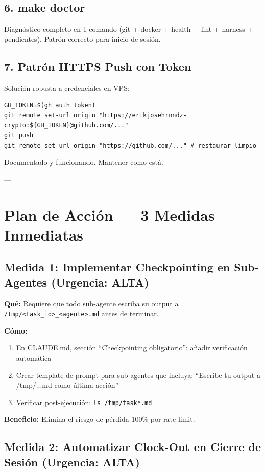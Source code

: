 \documentclass[12pt,a4paper,spanish]{article}
\begin{document}
\subsection{6. make doctor}

Diagnóstico completo en 1 comando (git + docker + health + lint + harness + pendientes). Patrón correcto para inicio de sesión.

\subsection{7. Patrón HTTPS Push con Token}

Solución robusta a credenciales en VPS:
\begin{lstlisting}
GH_TOKEN=$(gh auth token)
git remote set-url origin "https://erikjosehrnndz-crypto:${GH_TOKEN}@github.com/..."
git push
git remote set-url origin "https://github.com/..." # restaurar limpio
\end{lstlisting}

Documentado y funcionando. Mantener como está.

---

\section{Plan de Acción — 3 Medidas Inmediatas}

\subsection{Medida 1: Implementar Checkpointing en Sub-Agentes (Urgencia: ALTA)}

\textbf{Qué:} Requiere que todo sub-agente escriba su output a \texttt{/tmp/<task\_id>\_<agente>.md} antes de terminar.

\textbf{Cómo:}
\begin{enumerate}
  \item En CLAUDE.md, sección ``Checkpointing obligatorio'': añadir verificación automática
  \item Crear template de prompt para sub-agentes que incluya: ``Escribe tu output a /tmp/...md como última acción''
  \item Verificar post-ejecución: \texttt{ls /tmp/task*.md}
\end{enumerate}

\textbf{Beneficio:} Elimina el riesgo de pérdida 100\% por rate limit.

\subsection{Medida 2: Automatizar Clock-Out en Cierre de Sesión (Urgencia: ALTA)}
\end{document}

